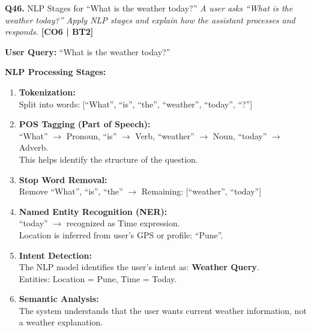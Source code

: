 \documentclass[12pt,a4paper]{article}
\newcommand{\Qno}[1]{\textbf{\color{darkred}Q#1.}}
\newcommand{\term}[1]{\textbf{\color{headingcolor}#1}}
\begin{document}
\vspace{8pt}

\begin{questionbox}{\Qno{46} NLP Stages for ``What is the weather today?''}
\textit{A user asks ``What is the weather today?'' Apply NLP stages and explain how the assistant processes and responds.} \hfill \textbf{[CO6 | BT2]}
\end{questionbox}

\begin{answerenv}

\textbf{User Query:} ``What is the weather today?''

\vspace{6pt}
\textbf{\color{headingcolor}NLP Processing Stages:}

\begin{enumerate}[leftmargin=1.8em, itemsep=5pt]
  \item \term{Tokenization:}\\
  Split into words: [``What'', ``is'', ``the'', ``weather'', ``today'', ``?'']

  \item \term{POS Tagging (Part of Speech):}\\
  ``What'' $\to$ Pronoun, ``is'' $\to$ Verb, ``weather'' $\to$ Noun, ``today'' $\to$ Adverb.\\
  This helps identify the structure of the question.

  \item \term{Stop Word Removal:}\\
  Remove ``What'', ``is'', ``the'' $\to$ Remaining: [``weather'', ``today'']

  \item \term{Named Entity Recognition (NER):}\\
  ``today'' $\to$ recognized as Time expression.\\
  Location is inferred from user's GPS or profile: ``Pune''.

  \item \term{Intent Detection:}\\
  The NLP model identifies the user's intent as: \textbf{Weather Query}.\\
  Entities: Location = Pune, Time = Today.

  \item \term{Semantic Analysis:}\\
  The system understands that the user wants current weather information, not a weather explanation.


\end{enumerate}
\end{answerenv}
\end{document}

